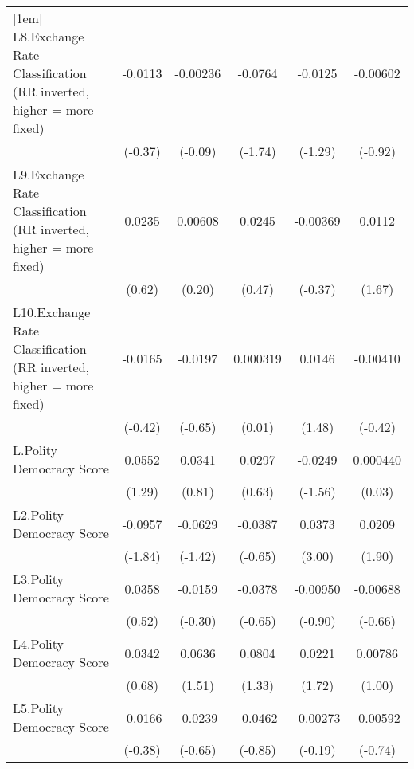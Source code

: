 {\begin{longtable}{l*{5}{c}}
[1em]
L8.Exchange Rate Classification (RR inverted, higher = more fixed)&  -0.0113         & -0.00236         &  -0.0764         &  -0.0125         & -0.00602         \\
                &  (-0.37)         &  (-0.09)         &  (-1.74)         &  (-1.29)         &  (-0.92)         \\
[1em]
L9.Exchange Rate Classification (RR inverted, higher = more fixed)&   0.0235         &  0.00608         &   0.0245         & -0.00369         &   0.0112         \\
                &   (0.62)         &   (0.20)         &   (0.47)         &  (-0.37)         &   (1.67)         \\
[1em]
L10.Exchange Rate Classification (RR inverted, higher = more fixed)&  -0.0165         &  -0.0197         & 0.000319         &   0.0146         & -0.00410         \\
                &  (-0.42)         &  (-0.65)         &   (0.01)         &   (1.48)         &  (-0.42)         \\
[1em]
L.Polity Democracy Score&   0.0552         &   0.0341         &   0.0297         &  -0.0249         & 0.000440         \\
                &   (1.29)         &   (0.81)         &   (0.63)         &  (-1.56)         &   (0.03)         \\
[1em]
L2.Polity Democracy Score&  -0.0957         &  -0.0629         &  -0.0387         &   0.0373\sym{**} &   0.0209         \\
                &  (-1.84)         &  (-1.42)         &  (-0.65)         &   (3.00)         &   (1.90)         \\
[1em]
L3.Polity Democracy Score&   0.0358         &  -0.0159         &  -0.0378         & -0.00950         & -0.00688         \\
                &   (0.52)         &  (-0.30)         &  (-0.65)         &  (-0.90)         &  (-0.66)         \\
[1em]
L4.Polity Democracy Score&   0.0342         &   0.0636         &   0.0804         &   0.0221         &  0.00786         \\
                &   (0.68)         &   (1.51)         &   (1.33)         &   (1.72)         &   (1.00)         \\
[1em]
L5.Polity Democracy Score&  -0.0166         &  -0.0239         &  -0.0462         & -0.00273         & -0.00592         \\
                &  (-0.38)         &  (-0.65)         &  (-0.85)         &  (-0.19)         &  (-0.74)         \\

\end{longtable}}
